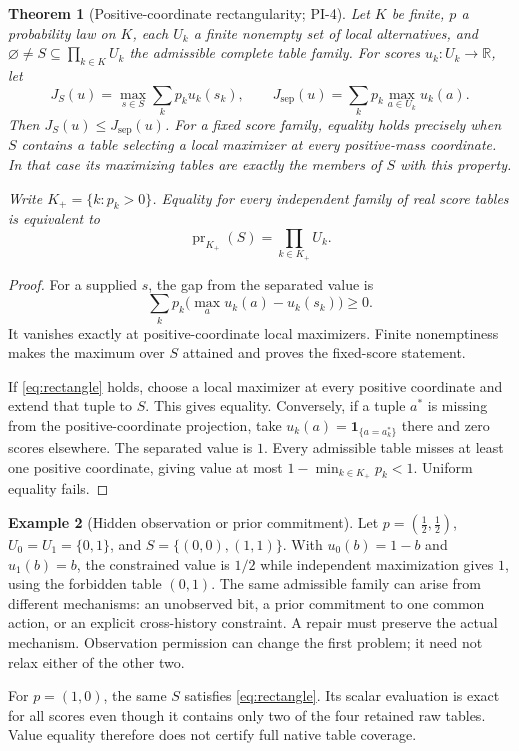 \documentclass[11pt]{article}
\newtheorem{theorem}{Theorem}[section]
\theoremstyle{definition}
\newtheorem{example}[theorem]{Example}
\DeclareMathOperator{\pr}{pr}
\newcommand{\R}{\mathbb R}
\begin{document}
\begin{theorem}[Positive-coordinate rectangularity; PI-4]
\label{thm:rectangle}
Let \(K\) be finite, \(p\) a probability law on \(K\), each \(U_k\) a finite
nonempty set of local alternatives, and
\(\varnothing\ne S\subseteq\prod_{k\in K}U_k\) the admissible complete
table family. For scores \(u_k:U_k\to\R\), let
\[
 J_S(u)=\max_{s\in S}\sum_kp_k u_k(s_k),\qquad
 J_{\mathrm{sep}}(u)=\sum_kp_k\max_{a\in U_k}u_k(a).
\]
Then \(J_S(u)\leq J_{\mathrm{sep}}(u)\). For a fixed score family,
equality holds precisely when \(S\) contains a table selecting a local
maximizer at every positive-mass coordinate. In that case its maximizing
tables are exactly the members of \(S\) with this property.

Write \(K_+=\{k:p_k>0\}\). Equality for \emph{every independent family
of real score tables} is equivalent to
\begin{equation}
 \pr_{K_+}(S)=\prod_{k\in K_+}U_k.
 \label{eq:rectangle}
\end{equation}
\end{theorem}
\begin{proof}
For a supplied \(s\), the gap from the separated value is
\[
 \sum_k p_k\bigl(\max_a u_k(a)-u_k(s_k)\bigr)\geq0.
\]
It vanishes exactly at positive-coordinate local maximizers. Finite
nonemptiness makes the maximum over \(S\) attained and proves the
fixed-score statement.

If \eqref{eq:rectangle} holds, choose a local maximizer at every
positive coordinate and extend that tuple to \(S\). This gives equality.
Conversely, if a tuple \(a^*\) is missing from the positive-coordinate
projection, take \(u_k(a)=\mathbf1_{\{a=a^*_k\}}\) there and zero scores
elsewhere. The separated value is \(1\). Every admissible table misses
at least one positive coordinate, giving value at most
\(1-\min_{k\in K_+}p_k<1\). Uniform equality fails.
\end{proof}

\begin{example}[Hidden observation or prior commitment]
\label{ex:diagonal}
Let \(p=(\tfrac12,\tfrac12)\), \(U_0=U_1=\{0,1\}\), and
\(S=\{(0,0),(1,1)\}\). With \(u_0(b)=1-b\) and \(u_1(b)=b\),
the constrained value is \(1/2\) while independent maximization gives
\(1\), using the forbidden table \((0,1)\). The same admissible family
can arise from different mechanisms: an unobserved bit, a prior commitment
to one common action, or an explicit cross-history constraint. A repair
must preserve the actual mechanism. Observation permission can change the
first problem; it need not relax either of the other two.

For \(p=(1,0)\), the same \(S\) satisfies \eqref{eq:rectangle}.
Its scalar evaluation is exact for all scores even though it contains only
two of the four retained raw tables. Value equality therefore does not
certify full native table coverage.
\end{example}
\end{document}
